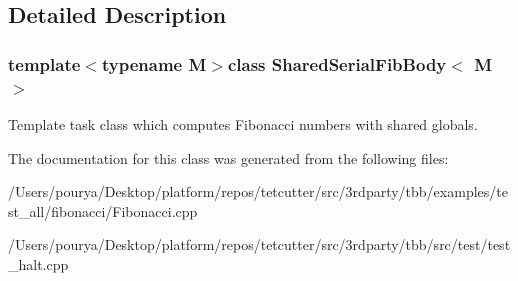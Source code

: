 \subsection{Detailed Description}
\subsubsection*{template$<$typename M$>$class Shared\+Serial\+Fib\+Body$<$ M $>$}

Template task class which computes Fibonacci numbers with shared globals. 

The documentation for this class was generated from the following files\+:\begin{DoxyCompactItemize}
\item 
/\+Users/pourya/\+Desktop/platform/repos/tetcutter/src/3rdparty/tbb/examples/test\+\_\+all/fibonacci/Fibonacci.\+cpp\item 
/\+Users/pourya/\+Desktop/platform/repos/tetcutter/src/3rdparty/tbb/src/test/test\+\_\+halt.\+cpp\end{DoxyCompactItemize}
